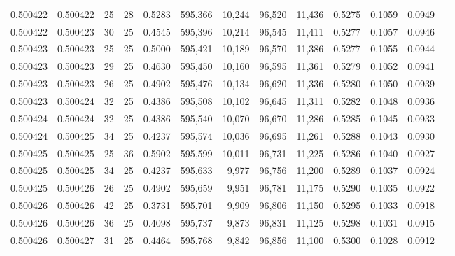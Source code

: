\begin{tabular}{rrrrrrrrrrrrr}
0.500422 & 0.500422 &    25 &  28 &                                     0.5283 & 595,366 &  10,244 &  96,520 &  11,436 & 0.5275 & 0.1059 & 0.0949 \\
0.500422 & 0.500423 &    30 &  25 &                                     0.4545 & 595,396 &  10,214 &  96,545 &  11,411 & 0.5277 & 0.1057 & 0.0946 \\
0.500423 & 0.500423 &    25 &  25 &                                     0.5000 & 595,421 &  10,189 &  96,570 &  11,386 & 0.5277 & 0.1055 & 0.0944 \\
0.500423 & 0.500423 &    29 &  25 &                                     0.4630 & 595,450 &  10,160 &  96,595 &  11,361 & 0.5279 & 0.1052 & 0.0941 \\
0.500423 & 0.500423 &    26 &  25 &                                     0.4902 & 595,476 &  10,134 &  96,620 &  11,336 & 0.5280 & 0.1050 & 0.0939 \\
0.500423 & 0.500424 &    32 &  25 &                                     0.4386 & 595,508 &  10,102 &  96,645 &  11,311 & 0.5282 & 0.1048 & 0.0936 \\
0.500424 & 0.500424 &    32 &  25 &                                     0.4386 & 595,540 &  10,070 &  96,670 &  11,286 & 0.5285 & 0.1045 & 0.0933 \\
0.500424 & 0.500425 &    34 &  25 &                                     0.4237 & 595,574 &  10,036 &  96,695 &  11,261 & 0.5288 & 0.1043 & 0.0930 \\
0.500425 & 0.500425 &    25 &  36 &                                     0.5902 & 595,599 &  10,011 &  96,731 &  11,225 & 0.5286 & 0.1040 & 0.0927 \\
0.500425 & 0.500425 &    34 &  25 &                                     0.4237 & 595,633 &   9,977 &  96,756 &  11,200 & 0.5289 & 0.1037 & 0.0924 \\
0.500425 & 0.500426 &    26 &  25 &                                     0.4902 & 595,659 &   9,951 &  96,781 &  11,175 & 0.5290 & 0.1035 & 0.0922 \\
0.500426 & 0.500426 &    42 &  25 &                                     0.3731 & 595,701 &   9,909 &  96,806 &  11,150 & 0.5295 & 0.1033 & 0.0918 \\
0.500426 & 0.500426 &    36 &  25 &                                     0.4098 & 595,737 &   9,873 &  96,831 &  11,125 & 0.5298 & 0.1031 & 0.0915 \\
0.500426 & 0.500427 &    31 &  25 &                                     0.4464 & 595,768 &   9,842 &  96,856 &  11,100 & 0.5300 & 0.1028 & 0.0912 \\

\end{tabular}
